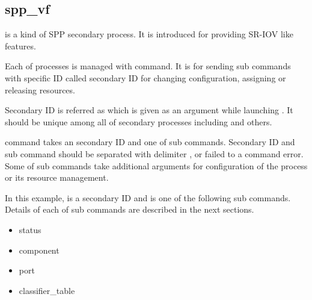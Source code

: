 \documentclass[a4paper,11pt,openany,oneside,english]{sphinxmanual}
\begin{document}
\begin{sphinxVerbatim}[commandchars=\\\{\},formatcom=\footnotesize]
\end{sphinxVerbatim}


\subsection{spp\_vf}
\label{\detokenize{commands/secondary/spp_vf:spp-vf}}\label{\detokenize{commands/secondary/spp_vf:commands-spp-vf}}\label{\detokenize{commands/secondary/spp_vf::doc}}
 is a kind of SPP secondary process. It is introduced for
providing SR-IOV like features.

Each of  processes is managed with  command. It is for
sending sub commands with specific ID called secondary ID for changing
configuration, assigning or releasing resources.

Secondary ID is referred as  which is given as an argument
while launching . It should be unique among all of secondary
processes including  and others.

 command takes an secondary ID and one of sub commands. Secondary ID
and sub command should be separated with delimiter \sphinxcode{\sphinxupquote{;}}, or failed to a
command error. Some of sub commands take additional arguments for
configuration of the process or its resource management.

\begin{sphinxVerbatim}[commandchars=\\\{\},formatcom=\footnotesize]
\end{sphinxVerbatim}

In this example,  is a secondary ID and  is one of the
following sub commands. Details of each of sub commands are described in the
next sections.
\begin{itemize}
\item {} 
status

\item {} 
component

\item {} 
port

\item {} 
classifier\_table

\end{itemize}
\end{document}
